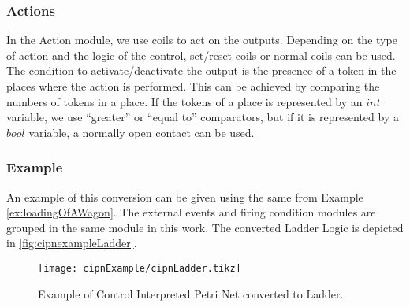 \subsubsection{Actions}
In the Action module, we use coils to act on the outputs. Depending on the type
of action and the logic of the control, set\slash reset coils or normal coils
can be used. The condition to activate\slash deactivate the output is the
presence of a token in the places where the action is performed.
This can be
achieved by comparing the numbers of tokens in a place. If the tokens of a
place is represented by an $int$ variable, we use ``greater'' or ``equal to'' comparators,
but if it is represented by a $bool$ variable, a normally open contact can be
used.
\subsubsection{Example}
An example of this conversion can be given using the same \CIPN{} from 
Example \ref{ex:loadingOfAWagon}.  The external events and firing condition
modules are grouped in the same module in this work. The converted Ladder Logic
is depicted in \autoref{fig:cipnexampleLadder}.
\begin{figure}[H]
  \centering \texttt{[image: cipnExample/cipnLadder.tikz]}
  \caption{Example of Control Interpreted Petri Net converted to
    Ladder.}
  \label{fig:cipnexampleLadder}
\end{figure}

